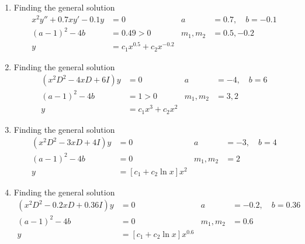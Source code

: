 \begin{enumerate}
    \item Finding the general solution
          \begin{align}
              x^{2}y'' + 0.7xy' - 0.1y & = 0                            &
              a                        & = 0.7, \quad b= -0.1             \\
              (a-1)^{2}-4b             & = 0.49 > 0                     &
              m_{1}, m_{2}             & =  0.5, -0.2                     \\
              y                        & = c_{1}x^{0.5} + c_{2}x^{-0.2}
          \end{align}

    \item Finding the general solution
          \begin{align}
              (x^{2}D^{2} - 4xD + 6I)y & = 0                       &
              a                        & = -4, \quad b= 6            \\
              (a-1)^{2}-4b             & = 1 > 0                   &
              m_{1}, m_{2}             & =  3, 2                     \\
              y                        & = c_{1}x^{3} + c_{2}x^{2}
          \end{align}

    \item Finding the general solution
          \begin{align}
              (x^{2}D^{2} - 3xD + 4I)y & = 0                           &
              a                        & = -3, \quad b= 4                \\
              (a-1)^{2}-4b             & = 0                           &
              m_{1}, m_{2}             & =  2                            \\
              y                        & = [ c_{1} + c_{2}\ln x ]x^{2}
          \end{align}

    \item Finding the general solution
          \begin{align}
              (x^{2}D^{2} - 0.2xD + 0.36I)y & = 0                              &
              a                             & = -0.2, \quad b= 0.36              \\
              (a-1)^{2}-4b                  & = 0                              &
              m_{1}, m_{2}                  & =  0.6                             \\
              y                             & = [ c_{1} + c_{2} \ln x ]x^{0.6}
          \end{align}


\end{enumerate}
